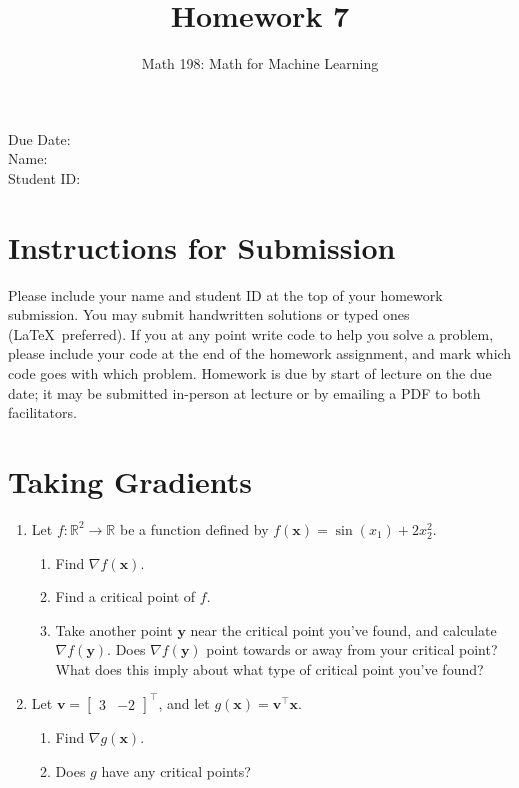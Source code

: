 \documentclass{article}
\title{Homework 7}
\author{Math 198: Math for Machine Learning}
\date{}
\begin{document}
\maketitle

\noindent
Due Date:  \\
Name: \\
Student ID:

\section*{Instructions for Submission}
Please include your name and student ID at the top of your homework submission. You may submit handwritten solutions or typed ones (\LaTeX\ preferred). If you at any point write code to help you solve a problem, please include your code at the end of the homework assignment, and mark which code goes with which problem. Homework is due by start of lecture on the due date; it may be submitted in-person at lecture or by emailing a PDF to both facilitators.

\section{Taking Gradients}
\begin{enumerate}[label=\arabic*.]
\item Let $f: \mathbb{R}^2 \rightarrow \mathbb{R}$ be a function defined by $f(\mathbf{x}) = \sin(x_1) + 2x_2^2$.
	\begin{enumerate}[label=(\alph*)]
	\item Find $\nabla f(\mathbf{x})$.
	\item Find a critical point of $f$.
	\item Take another point $\mathbf{y}$ near the critical point you've found, and calculate $\nabla f(\mathbf{y})$. Does $\nabla f(\mathbf{y})$ point towards or away from your critical point? What does this imply about what type of critical point you've found?
	\end{enumerate}
\item Let $\mathbf{v} = \begin{bmatrix} 3 & -2 \end{bmatrix}^\top$, and let $g(\mathbf{x}) = \mathbf{v^\top x}$.
	\begin{enumerate}[label=(\alph*)]
	\item Find $\nabla g(\mathbf{x})$.
	\item Does $g$ have any critical points?
	\end{enumerate}
\end{enumerate}
\end{document}
